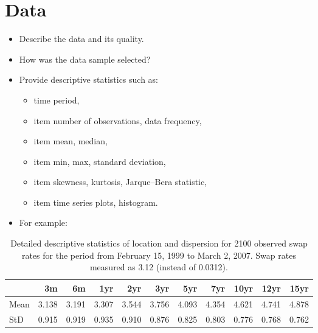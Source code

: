\documentclass[a4paper,11pt]{article}
\begin{document}
\hypertarget{data}{%
\section{Data}\label{data}}
\begin{itemize}
\item
  Describe the data and its quality.
\item
  How was the data sample selected?
\item
  Provide descriptive statistics such as:
  \begin{itemize}
  \item
    time period,
  \item
    item number of observations, data frequency,
  \item
    item mean, median,
  \item
    item min, max, standard deviation,
  \item
    item skewness, kurtosis, Jarque--Bera statistic,
  \item
    item time series plots, histogram.
  \end{itemize}
\item
  For example:
\end{itemize}
\begin{table}[H]

\caption{\label{tab:table1}Detailed descriptive statistics of location and dispersion for 2100 observed swap rates for the period from February 15, 1999 to March 2, 2007. Swap rates measured as 3.12 (instead of 0.0312).}
\centering
\begin{tabular}[t]{lrrrrrrrrrr}
\toprule
  & 3m & 6m & 1yr & 2yr & 3yr & 5yr & 7yr & 10yr & 12yr & 15yr\\
\midrule
Mean & 3.138 & 3.191 & 3.307 & 3.544 & 3.756 & 4.093 & 4.354 & 4.621 & 4.741 & 4.878\\
StD & 0.915 & 0.919 & 0.935 & 0.910 & 0.876 & 0.825 & 0.803 & 0.776 & 0.768 & 0.762\\
\midrule
\bottomrule
\end{tabular}
\end{table}
\end{document}
